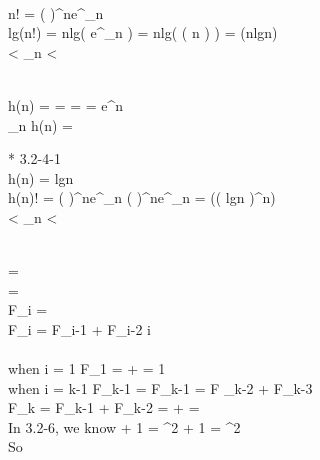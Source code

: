 \\
\because n! = \left (  \right )^{n}e^{\alpha _{n}} \\
\therefore lg(n!) = nlg\left ( \cdot {} \cdot e^{\alpha_{n}}  \right) = nlg\left ( \Theta \left ( n \right ) \right ) = \Theta (nlgn) \\
 < \alpha _{n} < 



\\
h(n) =  =  =  = e^{n} \\
\lim_{n \to \infty }h(n) = \infty

* 3.2-4-1
\\
h(n) = \left \lceil lgn \right \rceil \\
h(n)! = \left (  \right )^{n}e^{\alpha _{n}} \geq {}\left (  \right )^{n}e^{\alpha_{n}} = \Theta (\left ( lgn \right )^{n}) \\
 < \alpha _{n} < 


\\
\phi =  \\
\hat{\phi} =  \\
F_{i} =  \\
F_{i} = F_{i-1} + F_{i-2}  \quad i  \\

\\
when \quad i = 1 \quad F_{1} = \phi + \hat{\phi} = 1 \\
when \quad i = k-1 \quad F_{k-1} =  \quad F_{k-1} = F _{k-2} + F_{k-3} \\ 

F_{k} = F_{k-1} + F_{k-2} =  +  =  \\

In 3.2-6, we know \quad \phi + 1 = \phi ^{2} \quad \hat{\phi} + 1 = \hat{\phi}^{2} \\

So

